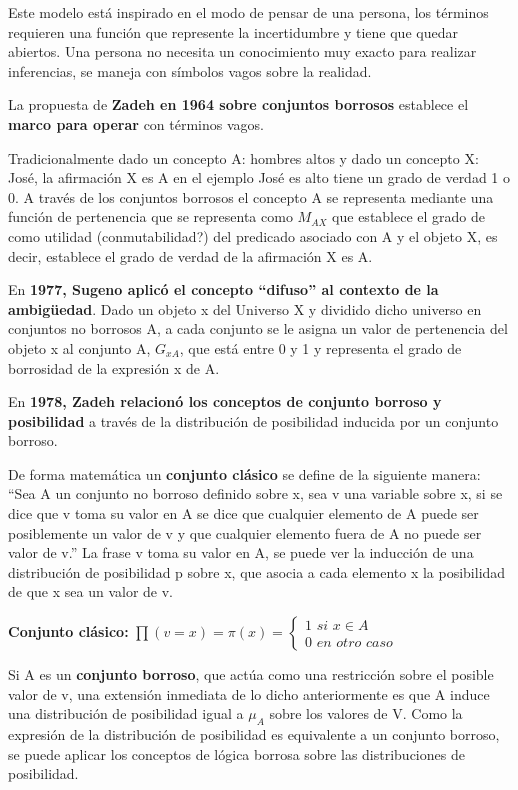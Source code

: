 \documentclass[12pt, twoside, openright]{report} %
\begin{document}
Este modelo está inspirado en el modo de pensar de una persona, los términos requieren una función que represente la incertidumbre y tiene que quedar abiertos. Una persona no necesita un conocimiento muy exacto para realizar inferencias, se maneja con símbolos vagos sobre la realidad.

La propuesta de \textbf{Zadeh en 1964 sobre conjuntos borrosos} establece el \textbf{marco para operar} con términos vagos. 

Tradicionalmente dado un concepto A: hombres altos y dado un concepto X: José, la afirmación X es A en el ejemplo José es alto tiene un grado de verdad 1 o 0. A través de los conjuntos borrosos el concepto A se representa mediante una función de pertenencia que se representa como $M_{AX}$ que establece el grado de como utilidad (conmutabilidad?) del predicado asociado con A y el objeto X, es decir, establece el grado de verdad de la afirmación X es A.

En \textbf{1977, Sugeno aplicó el concepto “difuso” al contexto de la ambigüedad}. Dado un objeto x del Universo X y dividido dicho universo en conjuntos no borrosos A, a cada conjunto se le asigna un valor de pertenencia del objeto x al conjunto A, $G_{xA}$, que está entre 0 y 1 y representa el grado de borrosidad de la expresión x de A.

En \textbf{1978, Zadeh relacionó los conceptos de conjunto borroso y posibilidad} a través de la distribución de posibilidad inducida por un conjunto borroso.

De forma matemática un \textbf{conjunto clásico} se define de la siguiente manera: “Sea A un conjunto no borroso definido sobre x, sea v una variable sobre x, si se dice que v toma su valor en A se dice que cualquier elemento de A puede ser posiblemente un valor de v y que cualquier elemento fuera de A no puede ser valor de v.” La frase v toma su valor en A, se puede ver la inducción de una distribución de posibilidad p sobre x, que asocia a cada elemento x la posibilidad de que x sea un valor de v.

\textbf{Conjunto clásico:} $\prod(v=x)=\pi(x)=\begin{cases} 1 \textit{ si } x \in A\\  0 \textit{ en otro caso} \end{cases}$

Si A es un \textbf{conjunto borroso}, que actúa como una restricción sobre el posible valor de v, una extensión inmediata de lo dicho anteriormente es que A induce una distribución de posibilidad igual a $\mu_A$ sobre los valores de V. Como la expresión de la distribución de posibilidad es equivalente a un conjunto borroso, se puede aplicar los conceptos de lógica borrosa sobre las distribuciones de posibilidad.
 
\end{document}
